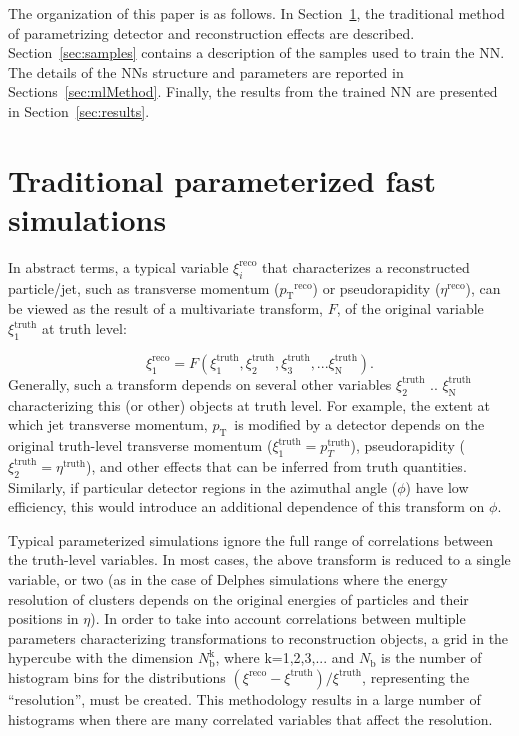 \documentclass[showpacs,showkeys,preprint,prd,nofootinbib,linenumbers,12pt,superscriptaddress]{revtex4-1}
\def\pt{\ensuremath{p_{\mathrm{T}}}}
\def\genRes{\ensuremath{(\xi^{\mathrm{reco}}-\xi^{\mathrm{truth}})/\xi^{\mathrm{truth}}}}
\begin{document}
The organization of this paper is as follows. In Section~\ref{sec:tradMethod}, the traditional method of parametrizing detector and reconstruction effects are described. Section~\ref{sec:samples} contains a description of the samples used to train the NN. The details of the NNs structure and parameters are reported in Sections~\ref{sec:mlMethod}. Finally, the results from the trained NN are presented in Section~\ref{sec:results}.
\FloatBarrier

\section{Traditional parameterized fast simulations}
\label{sec:tradMethod}
In abstract terms, a typical variable $\xi_i^{\mathrm{reco}}$ that characterizes a reconstructed particle/jet, such as transverse momentum (\pt$^{\mathrm{reco}}$) or pseudorapidity ($\eta^{\mathrm{reco}}$), can be viewed as the result of a multivariate transform, $F$, of the original variable $\xi_1^{\mathrm{truth}}$ at truth level:

$$
\xi_1^{\mathrm{reco}} = F (\xi_1^{\mathrm{truth}}, \xi_2^{\mathrm{truth}}, \xi_3^{\mathrm{truth}}, ...\xi_{\mathrm{N}}^{\mathrm{truth}}).
$$
Generally, such a transform  depends on several other variables $\xi_2^{\mathrm{truth}}$ ..  $\xi_{\mathrm{N}}^{\mathrm{truth}}$ characterizing this (or other) objects at truth level. For example, the extent at which jet transverse momentum, \pt\ is modified by a detector depends on the original truth-level transverse momentum ($\xi_1^{\mathrm{truth}}=p_T^{\mathrm{truth}}$), pseudorapidity ($\xi_2^{\mathrm{truth}}=\eta^{\mathrm{truth}}$), and other effects that can be inferred from truth quantities. Similarly, if particular detector regions in the azimuthal angle ($\phi$) have low efficiency, this would introduce an additional dependence of this transform on $\phi$.

 Typical parameterized simulations ignore the full range of correlations between the truth-level variables. In most cases, the above transform is reduced to a single variable, or two (as in the case of Delphes simulations where the energy resolution of clusters depends on the original energies of particles and their positions in $\eta$). In order to take into account correlations between multiple parameters characterizing transformations to reconstruction objects, a grid in the hypercube with the dimension $N_{\mathrm{b}}^{\mathrm{k}}$, where k=1,2,3,... and $N_{\mathrm{b}}$ is the number of histogram bins for the distributions \genRes, representing the ``resolution'', must be created. This methodology results in a large number of histograms when there are many correlated variables that affect the resolution.
\end{document}
